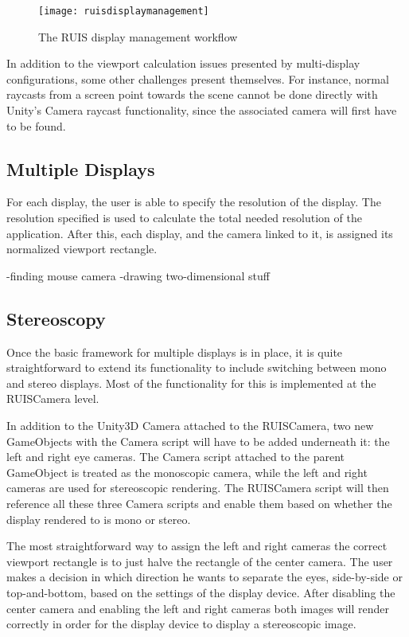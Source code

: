 \documentclass[12pt,a4paper,oneside,pdftex]{report}
\begin{document}
\begin{figure}[h]
\centering
\texttt{[image: ruisdisplaymanagement]}
\caption{The RUIS display management workflow}
\label{fig:displaymanagement}
\end{figure}

In addition to the viewport calculation issues presented by multi-display configurations, some other challenges present themselves. For instance, normal raycasts from a screen point towards the scene cannot be done directly with Unity's Camera raycast functionality, since the associated camera will first have to be found. 

\subsection{Multiple Displays}
\label{subsection:multidisplaysystems:multipledisplays}

For each display, the user is able to specify the resolution of the display. The resolution specified is used to calculate the total needed resolution of the application. After this, each display, and the camera linked to it, is assigned its normalized viewport rectangle. 

-finding mouse camera
-drawing two-dimensional stuff

\subsection{Stereoscopy}
\label{subsection:multidisplaysystems:stereoscopy}

Once the basic framework for multiple displays is in place, it is quite straightforward to extend its functionality to include switching between mono and stereo displays. Most of the functionality for this is implemented at the RUISCamera level.

In addition to the Unity3D Camera attached to the RUISCamera, two new GameObjects with the Camera script will have to be added underneath it: the left and right eye cameras. The Camera script attached to the parent GameObject is treated as the monoscopic camera, while the left and right cameras are used for stereoscopic rendering. The RUISCamera script will then reference all these three Camera scripts and enable them based on whether the display rendered to is mono or stereo. 

The most straightforward way to assign the left and right cameras the correct viewport rectangle is to just halve the rectangle of the center camera. The user makes a decision in which direction he wants to separate the eyes, side-by-side or top-and-bottom, based on the settings of the display device. After disabling the center camera and enabling the left and right cameras both images will render correctly in order for the display device to display a stereoscopic image.
\end{document}
